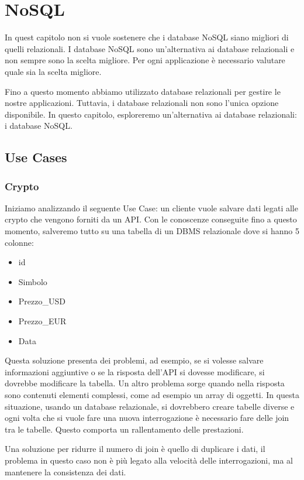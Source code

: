 \chapter{NoSQL}
\begin{nota}
      In quest capitolo non si vuole sostenere che i database NoSQL siano
      migliori di quelli relazionali. I database NoSQL sono un'alternativa
      ai database relazionali e non sempre sono la scelta migliore. Per ogni
      applicazione è necessario valutare quale sia la scelta migliore.
\end{nota}
Fino a questo momento abbiamo utilizzato database relazionali per gestire le
nostre applicazioni. Tuttavia, i database relazionali non sono l'unica
opzione disponibile. In questo capitolo, esploreremo un'alternativa ai
database relazionali: i database NoSQL.
\section*{Use Cases}
\subsection*{Crypto}
Iniziamo analizzando il seguente Use Case: un cliente vuole salvare dati legati
alle crypto che vengono forniti da un API. Con le conoscenze conseguite fino a
questo momento, salveremo tutto su una tabella di un DBMS relazionale dove si
hanno 5 colonne:
\begin{itemize}
      \item id
      \item Simbolo
      \item Prezzo\_USD
      \item Prezzo\_EUR
      \item Data
\end{itemize}
Questa soluzione presenta dei problemi, ad esempio, se si volesse salvare
informazioni aggiuntive o se la risposta dell'API si dovesse modificare, si
dovrebbe modificare la tabella. Un altro problema sorge quando nella risposta
sono contenuti elementi complessi, come ad esempio un array di oggetti. In questa
situazione, usando un database relazionale, si dovrebbero creare tabelle diverse
e ogni volta che si vuole fare una nuova interrogazione è necessario fare delle
join tra le tabelle. Questo comporta un rallentamento delle prestazioni.

Una soluzione per ridurre il numero di join è quello di duplicare i dati, il
problema in questo caso non è più legato alla velocità delle interrogazioni, ma
al mantenere la consistenza dei dati.

